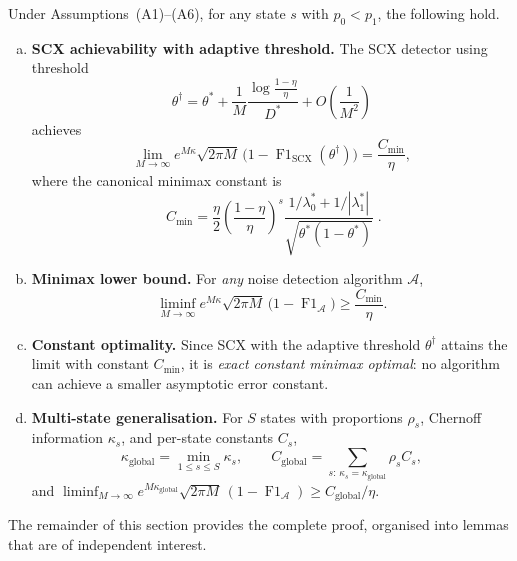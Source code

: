 \begin{theorem}
  \label{thm:exact_constant}
  Under Assumptions~(A1)--(A6), for any state $s$ with $p_0<p_1$, the
  following hold.
  \begin{enumerate}[(a)]
    \item \textbf{SCX achievability with adaptive threshold.}
      The SCX detector using threshold
      \[
      \theta^\dagger = \theta^*
        + \frac{1}{M}\frac{\log\frac{1-\eta}{\eta}}{D^*}
        + O\!\left(\frac1{M^2}\right)
      \]
      achieves
      \[
      \lim_{M\to\infty}
        e^{M\kappa}\sqrt{2\pi M}\,
        \bigl(1-\operatorname{F1}_{\text{SCX}}(\theta^\dagger)\bigr)
      = \frac{C_{\min}}{\eta},
      \]
      where the canonical minimax constant is
      \[
      \boxed{\;
      C_{\min}
      = \frac{\eta}{2}
        \left(\frac{1-\eta}{\eta}\right)^{\!s}
        \frac{1/\lambda_0^* + 1/|\lambda_1^*|}
             {\sqrt{\theta^*(1-\theta^*)}}\;}.
      \]

    \item \textbf{Minimax lower bound.}
      For \emph{any} noise detection algorithm $\mathcal{A}$,
      \[
      \liminf_{M\to\infty}
        e^{M\kappa}\sqrt{2\pi M}\,
        \bigl(1-\operatorname{F1}_{\mathcal{A}}\bigr)
      \ge \frac{C_{\min}}{\eta}.
      \]

    \item \textbf{Constant optimality.}
      Since SCX with the adaptive threshold $\theta^\dagger$ attains the
      limit with constant $C_{\min}$, it is \emph{exact constant minimax
      optimal}: no algorithm can achieve a smaller asymptotic error constant.

    \item \textbf{Multi-state generalisation.}
      For $S$ states with proportions $\rho_s$, Chernoff information
      $\kappa_s$, and per-state constants $C_s$,
      \[
      \kappa_{\text{global}} = \min_{1\le s\le S}\kappa_s,\qquad
      C_{\text{global}} = \sum_{s:\,\kappa_s=\kappa_{\text{global}}} \rho_s C_s,
      \]
      and $\displaystyle\liminf_{M\to\infty}
        e^{M\kappa_{\text{global}}}\sqrt{2\pi M}\,
        (1-\operatorname{F1}_{\mathcal{A}})
        \ge C_{\text{global}}/\eta$.
  \end{enumerate}
\end{theorem}

The remainder of this section provides the complete proof, organised into
lemmas that are of independent interest.

